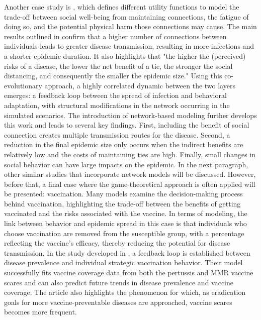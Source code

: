 Another case study is \cite{Nunner2021}, which defines different utility functions to model the trade-off between social well-being from maintaining connections, the fatigue of doing so, and the potential physical harm those connections may cause. The main results outlined in \cite{Nunner2021} confirm that a higher number of connections between individuals leads to greater disease transmission, resulting in more infections and a shorter epidemic duration. It also highlights that "the higher the (perceived) risks of a disease, the lower the net benefit of a tie, the stronger the social distancing, and consequently the smaller the epidemic size."
Using this co-evolutionary approach, a highly correlated dynamic between the two layers emerges: a feedback loop between the spread of infection and behavioral adaptation, with structural modifications in the network occurring in the simulated scenarios.
The introduction of network-based modeling further develops this work and leads to several key findings. First, including the benefit of social connection creates multiple transmission routes for the disease. Second, a reduction in the final epidemic size only occurs when the indirect benefits are relatively low and the costs of maintaining ties are high. Finally, small changes in social behavior can have large impacts on the epidemic.
In the next paragraph, other similar studies that incorporate network models will be discussed. However, before that, a final case where the game-theoretical approach is often applied will be presented: vaccination. Many models examine the decision-making process behind vaccination, highlighting the trade-off between the benefits of getting vaccinated and the risks associated with the vaccine.
In terms of modeling, the link between behavior and epidemic spread in this case is that individuals who choose vaccination are removed from the susceptible group, with a percentage reflecting the vaccine's efficacy, thereby reducing the potential for disease transmission. In the study developed in \cite{Bauch_2012_game}, a feedback loop is established between disease prevalence and individual strategic vaccination behavior. Their model successfully fits vaccine coverage data from both the pertussis and MMR vaccine scares and can also predict future trends in disease prevalence and vaccine coverage. The article also highlights the phenomenon for which, as eradication goals for more vaccine-preventable diseases are approached, vaccine scares becomes more frequent.

